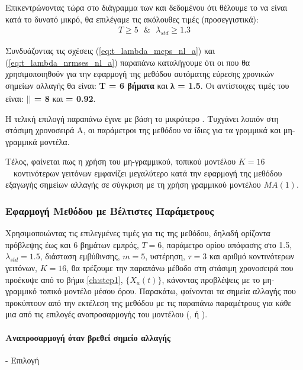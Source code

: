 \par Επικεντρώνοντας τώρα στο διάγραμμα των  και δεδομένου ότι θέλουμε το  να είναι κατά το δυνατό μικρό, θα επιλέγαμε τις ακόλουθες τιμές (προσεγγιστικά):
\begin{align}
    T \geq 5 \ \ \ \& \ \ \ \lambda_{std} \geq 1.3
    \label{eq:t_lambda_nrmses_nl_a}
\end{align}

\par Συνδυάζοντας τις σχέσεις (\ref{eq:t_lambda_mcps_nl_a}) και (\ref{eq:t_lambda_nrmses_nl_a}) παραπάνω καταλήγουμε ότι οι  που θα χρησιμοποιηθούν για την εφαρμογή της μεθόδου αυτόματης εύρεσης χρονικών σημείων αλλαγής θα είναι:
\textbf{T = 6 βήματα} και \textbf{λ\textsubscript{} = 1.5}. Οι αντίστοιχες τιμές του  είναι: \textbf{$\vert$$\vert$ = 8 } και \textbf{ = 0.92}.

\par Η τελική επιλογή παραπάνω έγινε με βάση το μικρότερο . Τυχγάνει λοιπόν στη στάσιμη χρονοσειρά Α, οι παράμετροι της μεθόδου να ίδιες για τα γραμμικά και μη-γραμμικά μοντέλα.

\par Τέλος, φαίνεται πως η χρήση του μη-γραμμικού, τοπικού μοντέλου $K=16$\ \ κοντινότερων γειτόνων εμφανίζει μεγαλύτερο  κατά την εφαρμογή της μεθόδου εξαγωγής σημείων αλλαγής σε σύγκριση με τη χρήση γραμμικού μοντέλου $MA(1)$.

\subsubsection{Εφαρμογή Μεθόδου με Βέλτιστες Παράμετρους}

Χρησιμοποιώντας τις επιλεγμένες τιμές για τις  της μεθόδου, δηλαδή ορίζοντα πρόβλεψης έως και 6 βημάτων εμπρός, $T=6$, παράμετρο ορίου απόφασης στο 1.5, $\lambda_{std}=1.5$, διάσταση εμβύθινσης, $m=5$, υστέρηση, $\tau=3$ και αριθμό κοντινότερων γειτόνων, $K=16$, θα τρέξουμε την παραπάνω μέθοδο στη στάσιμη χρονοσειρά που προέκυψε από το βήμα \ref{ch:step1}, $\{X_a(t)\}$, κάνοντας προβλέψεις με το μη-γραμμικό τοπικό μοντέλο μέσου όρου. Παρακάτω, φαίνονται τα σημεία αλλαγής που προκύπτουν από την εκτέλεση της μεθόδου με τις παραπάνω παραμέτρους για κάθε μια από τις επιλογές αναπροσαρμογής του μοντέλου (,  ή ).

\paragraph{Αναπροσαρμογή όταν βρεθεί σημείο αλλαγής}- Επιλογή 

